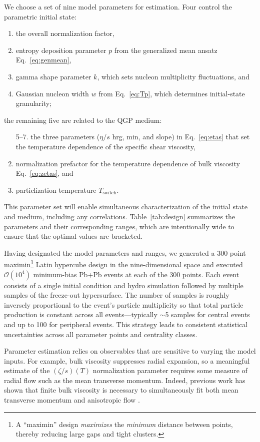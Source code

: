 \documentclass[aps,prc,reprint,amsmath,nofootinbib]{revtex4-1}
\newcommand{\order}[1]{$\mathcal O(10^{#1})$}
\begin{document}
We choose a set of nine model parameters for estimation.
Four control the parametric initial state:
\begin{enumerate}[itemsep=0pt]
  \item the overall normalization factor,
  \item entropy deposition parameter $p$ from the generalized mean ansatz Eq.~\eqref{eq:genmean},
  \item gamma shape parameter $k$, which sets nucleon multiplicity fluctuations, and
  \item Gaussian nucleon width $w$ from Eq.~\eqref{eq:Tp}, which determines initial-state granularity;
\end{enumerate}
the remaining five are related to the QGP medium:
\begin{enumerate}[itemsep=0pt]
  \item[5--7.] the three parameters ($\eta/s$ hrg, min, and slope) in Eq.~\eqref{eq:etas} that set the temperature dependence of the specific shear viscosity,
  \setcounter{enumi}{7}
  \item normalization prefactor for the temperature dependence of bulk viscosity Eq.~\eqref{eq:zetas}, and
  \item particlization temperature $T_\text{switch}$.
\end{enumerate}
This parameter set will enable simultaneous characterization of the initial state and medium, including any correlations.
Table~\ref{tab:design} summarizes the parameters and their corresponding ranges, which are intentionally wide to ensure that the optimal values are bracketed.

Having designated the model parameters and ranges, we generated a 300 point maximin\footnote{A ``maximin'' design \emph{maximizes} the \emph{minimum} distance between points, thereby reducing large gaps and tight clusters.} Latin hypercube design \cite{Morris:1995lh} in the nine-dimensional space and executed \order 4 minimum-bias Pb+Pb events at each of the 300 points.
Each event consists of a single initial condition and hydro simulation followed by multiple samples of the freeze-out hypersurface.
The number of samples is roughly inversely proportional to the event's particle multiplicity so that total particle production is constant across all events---typically ${\sim}$5 samples for central events and up to 100 for peripheral events.
This strategy leads to consistent statistical uncertainties across all parameter points and centrality classes.

Parameter estimation relies on observables that are sensitive to varying the model inputs.
For example, bulk viscosity suppresses radial expansion, so a meaningful estimate of the $(\zeta/s)(T)$ normalization parameter requires some measure of radial flow such as the mean transverse momentum.
Indeed, previous work has shown that finite bulk viscosity is necessary to simultaneously fit both mean transverse momentum and anisotropic flow \cite{Ryu:2015vwa}.
\end{document}
